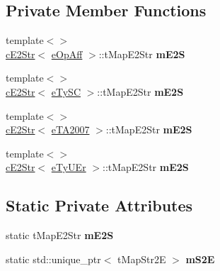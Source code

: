 \subsection*{Private Member Functions}
\begin{DoxyCompactItemize}
\item 
{\footnotesize template$<$$>$ }\\\hyperlink{classMMVII_1_1cE2Str}{c\+E2\+Str}$<$ \hyperlink{MMVII__enums_8h_a14edea285bb2396d1a1f9f30b782c271}{e\+Op\+Aff} $>$\+::t\+Map\+E2\+Str {\bfseries m\+E2S}\hypertarget{classMMVII_1_1cE2Str_a991949cca0d024268ce44c12fc0b968d}{}\label{classMMVII_1_1cE2Str_a991949cca0d024268ce44c12fc0b968d}

\item 
{\footnotesize template$<$$>$ }\\\hyperlink{classMMVII_1_1cE2Str}{c\+E2\+Str}$<$ \hyperlink{MMVII__enums_8h_a04fcd74deb7c7ab4218cbb194a03239c}{e\+Ty\+SC} $>$\+::t\+Map\+E2\+Str {\bfseries m\+E2S}\hypertarget{classMMVII_1_1cE2Str_a25bc1fe325738c5dd14625e7573bdc6a}{}\label{classMMVII_1_1cE2Str_a25bc1fe325738c5dd14625e7573bdc6a}

\item 
{\footnotesize template$<$$>$ }\\\hyperlink{classMMVII_1_1cE2Str}{c\+E2\+Str}$<$ \hyperlink{MMVII__enums_8h_a9d431a971072a6c440012f6325f616ad}{e\+T\+A2007} $>$\+::t\+Map\+E2\+Str {\bfseries m\+E2S}\hypertarget{classMMVII_1_1cE2Str_a0ba876d9737a4afdc55f87ba5814c161}{}\label{classMMVII_1_1cE2Str_a0ba876d9737a4afdc55f87ba5814c161}

\item 
{\footnotesize template$<$$>$ }\\\hyperlink{classMMVII_1_1cE2Str}{c\+E2\+Str}$<$ \hyperlink{MMVII__enums_8h_a50f2e36819c49b810da7e1f3959269a4}{e\+Ty\+U\+Er} $>$\+::t\+Map\+E2\+Str {\bfseries m\+E2S}\hypertarget{classMMVII_1_1cE2Str_a9d74b1da1c488e744f39fe0afecb8b22}{}\label{classMMVII_1_1cE2Str_a9d74b1da1c488e744f39fe0afecb8b22}

\end{DoxyCompactItemize}
\subsection*{Static Private Attributes}
\begin{DoxyCompactItemize}
\item 
static t\+Map\+E2\+Str {\bfseries m\+E2S}\hypertarget{classMMVII_1_1cE2Str_aad0638fa9eeb8f9d27ad1f81b76c4f97}{}\label{classMMVII_1_1cE2Str_aad0638fa9eeb8f9d27ad1f81b76c4f97}

\item 
static std\+::unique\+\_\+ptr$<$ t\+Map\+Str2E $>$ {\bfseries m\+S2E}\hypertarget{classMMVII_1_1cE2Str_abfbd2c52b4afad14798031eb2d5a90b0}{}\label{classMMVII_1_1cE2Str_abfbd2c52b4afad14798031eb2d5a90b0}

\end{DoxyCompactItemize}


